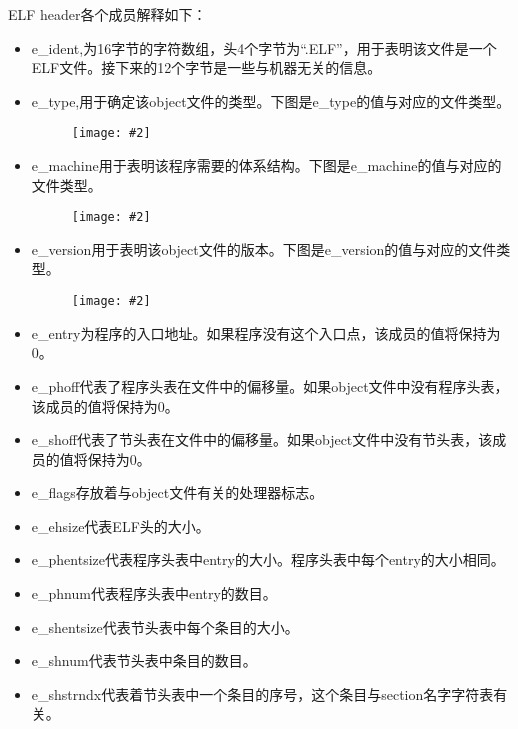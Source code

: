 \documentclass[a4paper,left=2.5cm,right=2.5cm,11pt]{article}
\newcommand{\sizedfic}[2]{\begin{figure}[H]
		\center
		\texttt{[image: \#2]}
	\end{figure}}
\begin{document}
	ELF header各个成员解释如下：
	\begin{itemize}
		\item e\_ident,为16字节的字符数组，头4个字节为“.ELF”，用于表明该文件是一个ELF文件。接下来的12个字节是一些与机器无关的信息。
		\item e\_type,用于确定该object文件的类型。下图是e\_type的值与对应的文件类型。
		\sizedfic{0.5}{9.png}

		\item e\_machine用于表明该程序需要的体系结构。下图是e\_machine的值与对应的文件类型。
		\sizedfic{0.5}{10.png}

		\item e\_version用于表明该object文件的版本。下图是e\_version的值与对应的文件类型。
		\sizedfic{0.5}{11.png}

		\item e\_entry为程序的入口地址。如果程序没有这个入口点，该成员的值将保持为0。
		\item e\_phoff代表了程序头表在文件中的偏移量。如果object文件中没有程序头表，该成员的值将保持为0。
		\item e\_shoff代表了节头表在文件中的偏移量。如果object文件中没有节头表，该成员的值将保持为0。
		\item e\_flags存放着与object文件有关的处理器标志。
		\item e\_ehsize代表ELF头的大小。
		\item e\_phentsize代表程序头表中entry的大小。程序头表中每个entry的大小相同。
		\item e\_phnum代表程序头表中entry的数目。
		\item e\_shentsize代表节头表中每个条目的大小。
		\item e\_shnum代表节头表中条目的数目。
		\item e\_shstrndx代表着节头表中一个条目的序号，这个条目与section名字字符表有关。
	\end{itemize}
\end{document}
